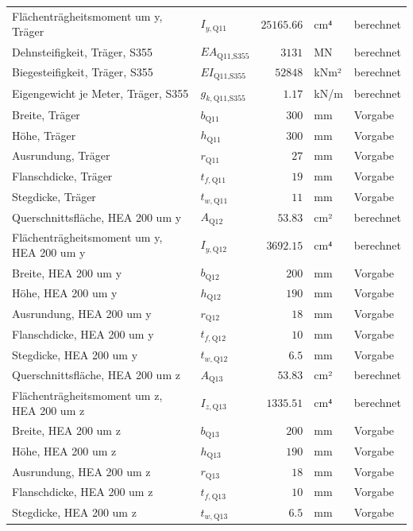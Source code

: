 \documentclass[11pt,a4paper]{article}
\begin{document}
\begin{xltabular}{\linewidth}{>{\raggedright\arraybackslash}Xlrll}
Flächenträgheitsmoment um y, Träger & $I_{y,\text{Q11}}$ & $25165.66$ & cm⁴ & berechnet \\
Dehnsteifigkeit, Träger, S355 & $EA_{\text{Q11,S355}}$ & $3131$ & MN & berechnet \\
Biegesteifigkeit, Träger, S355 & $EI_{\text{Q11,S355}}$ & $52848$ & kNm² & berechnet \\
Eigengewicht je Meter, Träger, S355 & $g_{k,\text{Q11,S355}}$ & $1.17$ & kN/m & berechnet \\
Breite, Träger & $b_{\text{Q11}}$ & $300$ & mm & Vorgabe \\
Höhe, Träger & $h_{\text{Q11}}$ & $300$ & mm & Vorgabe \\
Ausrundung, Träger & $r_{\text{Q11}}$ & $27$ & mm & Vorgabe \\
Flanschdicke, Träger & $t_{f,\text{Q11}}$ & $19$ & mm & Vorgabe \\
Stegdicke, Träger & $t_{w,\text{Q11}}$ & $11$ & mm & Vorgabe \\
Querschnittsfläche, HEA 200 um y & $A_{\text{Q12}}$ & $53.83$ & cm² & berechnet \\
Flächenträgheitsmoment um y, HEA 200 um y & $I_{y,\text{Q12}}$ & $3692.15$ & cm⁴ & berechnet \\
Breite, HEA 200 um y & $b_{\text{Q12}}$ & $200$ & mm & Vorgabe \\
Höhe, HEA 200 um y & $h_{\text{Q12}}$ & $190$ & mm & Vorgabe \\
Ausrundung, HEA 200 um y & $r_{\text{Q12}}$ & $18$ & mm & Vorgabe \\
Flanschdicke, HEA 200 um y & $t_{f,\text{Q12}}$ & $10$ & mm & Vorgabe \\
Stegdicke, HEA 200 um y & $t_{w,\text{Q12}}$ & $6.5$ & mm & Vorgabe \\
Querschnittsfläche, HEA 200 um z & $A_{\text{Q13}}$ & $53.83$ & cm² & berechnet \\
Flächenträgheitsmoment um z, HEA 200 um z & $I_{z,\text{Q13}}$ & $1335.51$ & cm⁴ & berechnet \\
Breite, HEA 200 um z & $b_{\text{Q13}}$ & $200$ & mm & Vorgabe \\
Höhe, HEA 200 um z & $h_{\text{Q13}}$ & $190$ & mm & Vorgabe \\
Ausrundung, HEA 200 um z & $r_{\text{Q13}}$ & $18$ & mm & Vorgabe \\
Flanschdicke, HEA 200 um z & $t_{f,\text{Q13}}$ & $10$ & mm & Vorgabe \\
Stegdicke, HEA 200 um z & $t_{w,\text{Q13}}$ & $6.5$ & mm & Vorgabe \\

\end{xltabular}
\end{document}
